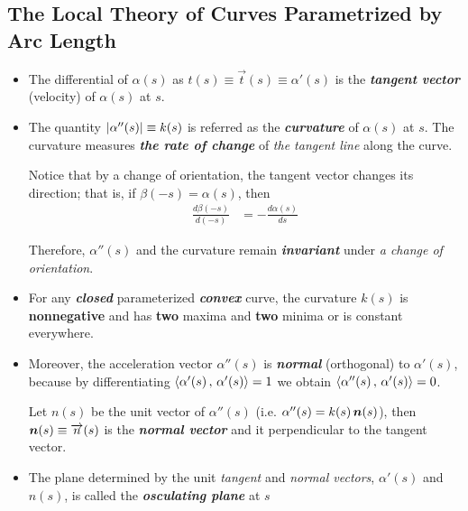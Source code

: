 \documentclass[11pt]{article}
\begin{document}
\subsection{The Local Theory of Curves Parametrized by Arc Length}
\begin{itemize}
\item The differential of $\alpha(s)$ as $t(s) \equiv \overrightarrow{t}(s) \equiv \alpha'(s)$ is the \emph{\textbf{tangent vector}} (velocity) of $\alpha(s)$ at $s$. 

\item 
\begin{definition}
The quantity $\left\lvert \alpha''(s) \right\rvert \equiv k(s)$ is referred as the \emph{\textbf{curvature}} of $\alpha(s)$ at $s$. The curvature measures \emph{\textbf{the rate of change}} of \emph{the tangent line} along the curve. 
\end{definition}

Notice that by a change of orientation, the tangent vector changes its direction; that is, if $\beta(-s) = \alpha(s)$, then
\begin{align*}
\frac{d \beta(-s)}{d(-s)} &= -\frac{d\alpha(s)}{ds}
\end{align*}

Therefore, $\alpha''(s)$ and the curvature remain \emph{\textbf{invariant}} under \emph{a change of orientation}.

\item For any \textbf{\emph{closed}} parameterized \textbf{\emph{convex}} curve, the curvature $k(s)$ is \textbf{nonnegative} and has \textbf{two} maxima and \textbf{two} minima or is constant everywhere. 

\item Moreover, the acceleration vector  $\alpha''(s)$ is \emph{\textbf{normal}} (orthogonal) to $\alpha'(s)$, because by differentiating $\left\langle \alpha'(s)\,,\, \alpha'(s) \right\rangle = 1$ we obtain $\left\langle \alpha''(s)\,,\, \alpha'(s) \right\rangle = 0$. 

Let $n(s)$ be the unit vector of $\alpha''(s)$ (i.e. $\alpha''(s) = k(s)\,\boldsymbol{n}(s)$), then $\boldsymbol{n}(s) \equiv \overrightarrow{n}(s)$ is the \emph{\textbf{normal vector}} and it perpendicular to the tangent vector.

\item The plane determined by the unit \emph{tangent} and \emph{normal vectors}, $\alpha'(s)$ and $n(s)$, is called the \emph{\textbf{osculating plane}} at $s$


\end{itemize}
\end{document}
